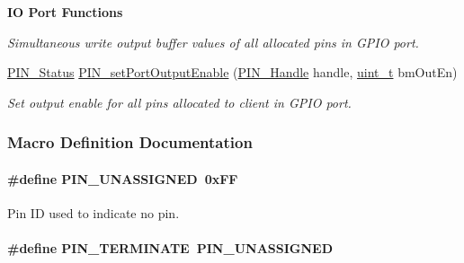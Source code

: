 \begin{Indent}{\bf I\+O Port Functions}
\begin{DoxyCompactItemize}
\begin{DoxyCompactList}\small\item\em Simultaneous write output buffer values of all allocated pins in G\+P\+I\+O port. \end{DoxyCompactList}\item 
\hyperlink{_p_i_n_8h_abe0ad59bbf09e51fe37195a5e70b23f6}{P\+I\+N\+\_\+\+Status} \hyperlink{_p_i_n_8h_a597fe2039644ee0389980d0a729de4e7}{P\+I\+N\+\_\+set\+Port\+Output\+Enable} (\hyperlink{_p_i_n_8h_afb2de52b054638f63c39df1f30a0d88d}{P\+I\+N\+\_\+\+Handle} handle, \hyperlink{_p_i_n_8h_a12a1e9b3ce141648783a82445d02b58d}{uint\+\_\+t} bm\+Out\+En)
\begin{DoxyCompactList}\small\item\em Set output enable for all pins allocated to client in G\+P\+I\+O port. \end{DoxyCompactList}\end{DoxyCompactItemize}
\end{Indent}


\subsubsection{Macro Definition Documentation}
\paragraph[{P\+I\+N\+\_\+\+U\+N\+A\+S\+S\+I\+G\+N\+E\+D}]{\setlength{\rightskip}{0pt plus 5cm}\#define P\+I\+N\+\_\+\+U\+N\+A\+S\+S\+I\+G\+N\+E\+D~0x\+F\+F}\label{_p_i_n_8h_aba219226dfdc9ea2fb82d6a7995395bf}


Pin I\+D used to indicate no pin. 

\paragraph[{P\+I\+N\+\_\+\+T\+E\+R\+M\+I\+N\+A\+T\+E}]{\setlength{\rightskip}{0pt plus 5cm}\#define P\+I\+N\+\_\+\+T\+E\+R\+M\+I\+N\+A\+T\+E~{\bf P\+I\+N\+\_\+\+U\+N\+A\+S\+S\+I\+G\+N\+E\+D}}\label{_p_i_n_8h_ae22ec44ad92ee130a665ca56aad38c75}


